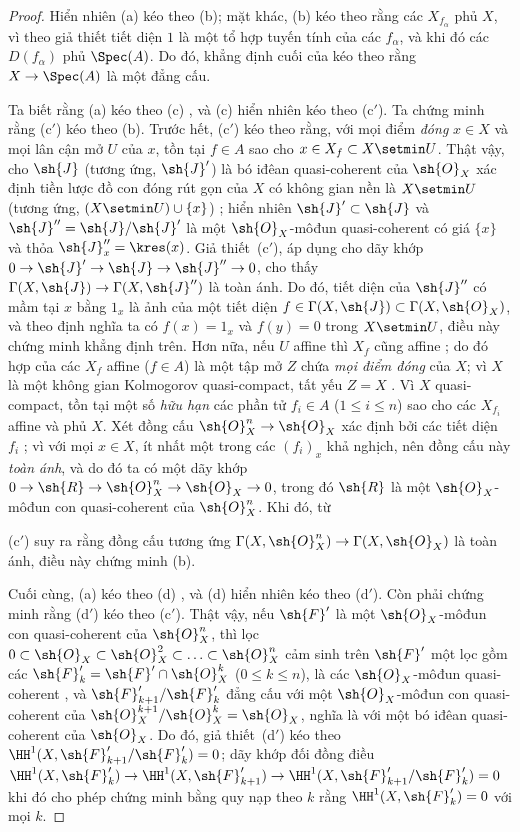 \documentclass[oneside,10pt]{amsart}
\makeatletter
\renewcommand{\leq}{\leqslant}
\newcommand{\ega@arrow}[2]{\mathchoice{#1}{#2}{#2}{#2}}
\renewcommand{\to}{\ega@arrow{\longrightarrow}{\rightarrow}}
\newcommand{\oldpage}[2][]{\marginnote{\normalfont\footnotesize\textbf{#1}~|~#2}\ignorespaces}
\makeatother
\begin{document}
\begin{proof}
Hiển nhiên (a) kéo theo (b);
mặt khác, (b) kéo theo rằng các $X_{f_\alpha}$ phủ $X$, vì theo giả thiết tiết diện $1$ là một tổ hợp tuyến tính của các $f_\alpha$, và khi đó các $D(f_\alpha)$ phủ $\Spec(A)$.
Do đó, khẳng định cuối của  kéo theo rằng $X\to\Spec(A)$ là một đẳng cấu.

Ta biết rằng (a) kéo theo (c) , và (c) hiển nhiên kéo theo (c$'$).
Ta chứng minh rằng (c$'$) kéo theo (b).
Trước hết, (c$'$) kéo theo rằng, với mọi điểm \emph{đóng} $x\in X$ và mọi lân cận mở $U$ của $x$, tồn tại $f\in A$ sao cho $x\in X_f\subset X\setmin U$.
Thật vậy, cho $\sh{J}$ (tương ứng, $\sh{J}'$) là bó iđêan quasi-coherent của $\sh{O}_X$ xác định tiền lược đồ con đóng rút gọn của $X$ có không gian nền là $X\setmin U$ (tương ứng, $(X\setmin U)\cup\{x\}$) ;
hiển nhiên $\sh{J}'\subset\sh{J}$ và $\sh{J}''=\sh{J}/\sh{J}'$ là một $\sh{O}_X$-môđun quasi-coherent có giá $\{x\}$ và thỏa $\sh{J}_x''=\kres(x)$.
Giả thiết~(c$'$), áp dụng cho dãy khớp $0\to\sh{J}'\to\sh{J}\to\sh{J}''\to0$, cho thấy $\Gamma(X,\sh{J})\to\Gamma(X,\sh{J}'')$ là toàn ánh.
Do đó, tiết diện của $\sh{J}''$ có mầm tại $x$ bằng $1_x$ là ảnh của một tiết diện $f\in\Gamma(X,\sh{J})\subset\Gamma(X,\sh{O}_X)$, và theo định nghĩa ta có $f(x)=1_x$ và $f(y)=0$ trong $X\setmin U$, điều này chứng minh khẳng định trên.
Hơn nữa, nếu $U$ affine thì $X_f$ cũng affine ; do đó hợp của các $X_f$ affine ($f\in A$) là một tập mở $Z$ chứa \emph{mọi điểm đóng} của $X$;
vì $X$ là một không gian Kolmogorov quasi-compact, tất yếu $Z=X$ .
Vì $X$ quasi-compact, tồn tại một số \emph{hữu hạn} các phần tử $f_i\in A$ ($1\leq i\leq n$) sao cho các $X_{f_i}$ affine và phủ $X$.
Xét đồng cấu $\sh{O}_X^n\to\sh{O}_X$ xác định bởi các tiết diện $f_i$ ;
vì với mọi $x\in X$, ít nhất một trong các $(f_i)_x$ khả nghịch, nên đồng cấu này \emph{toàn ánh}, và do đó ta có một dãy khớp $0\to\sh{R}\to\sh{O}_X^n\to\sh{O}_X\to0$, trong đó $\sh{R}$ là một $\sh{O}_X$-môđun con quasi-coherent của $\sh{O}_X^n$.
Khi đó, từ

\oldpage[II]{98}
(c$'$) suy ra rằng đồng cấu tương ứng $\Gamma(X,\sh{O}_X^n)\to\Gamma(X,\sh{O}_X)$ là toàn ánh, điều này chứng minh (b).

Cuối cùng, (a) kéo theo (d) , và (d) hiển nhiên kéo theo (d$'$).
Còn phải chứng minh rằng (d$'$) kéo theo (c$'$).
Thật vậy, nếu $\sh{F}'$ là một $\sh{O}_X$-môđun con quasi-coherent của $\sh{O}_X^n$, thì lọc $0\subset\sh{O}_X\subset\sh{O}_X^2\subset\ldots\subset\sh{O}_X^n$ cảm sinh trên $\sh{F}'$ một lọc gồm các $\sh{F}'_k=\sh{F}'\cap\sh{O}_X^k$ ($0\leq k\leq n$), là các $\sh{O}_X$-môđun quasi-coherent , và $\sh{F}'_{k+1}/\sh{F}'_k$ đẳng cấu với một $\sh{O}_X$-môđun con quasi-coherent của $\sh{O}_X^{k+1}/\sh{O}_X^k=\sh{O}_X$, nghĩa là với một bó iđêan quasi-coherent của $\sh{O}_X$.
Do đó, giả thiết~(d$'$) kéo theo $\HH^1(X,\sh{F}'_{k+1}/\sh{F}'_k)=0$;
dãy khớp đối đồng điều $\HH^1(X,\sh{F}'_k)\to\HH^1(X,\sh{F}'_{k+1})\to\HH^1(X,\sh{F}'_{k+1}/\sh{F}'_k)=0$ khi đó cho phép chứng minh bằng quy nạp theo $k$ rằng $\HH^1(X,\sh{F}'_k)=0$ với mọi $k$.
\end{proof}
\end{document}
